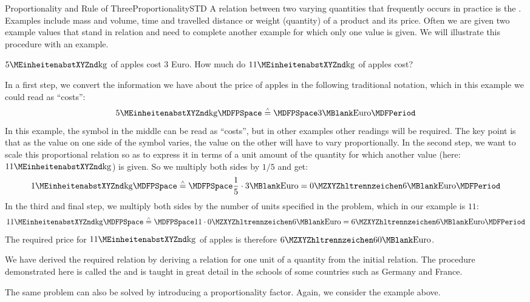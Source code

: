 \begin{MXContent}{Proportionality and Rule of Three}{Proportionality}{STD}
A relation between two varying quantities that frequently occurs in practice is the 
. Examples include 
mass and volume, time and travelled distance or weight (quantity) of a product and its price. 
Often we are given two example values that stand in relation and need to complete another example for which only one value is given.
We will illustrate this procedure with an example. 


\begin{MExample}
$5\MEinheit{kg}$ of apples cost $3$ Euro. How much do $11\MEinheit{kg}$
of apples cost?
\par
In a first step, we convert the information we have about the price of apples in the following traditional notation, which in this example we could read as ``costs'':
$$
5\MEinheit{kg} \MDFPSpace \MRelates \MDFPSpace 3\MBlank \text{Euro}
\MDFPeriod
$$
In this example, the symbol in the middle can be read as ``costs'', but in other examples other readings will be required. The key point is that as the value on one side of the
symbol varies, the value on the other will have to vary proportionally.
In the second step, we want to scale this proportional relation so as to express it in terms of a unit amount of the quantity for which another value (here: $11\MEinheit{kg}$) is given. So we multiply both sides by $1/5$ and get:
$$
1\MEinheit{kg} \MDFPSpace \MRelates \MDFPSpace 
\frac{1}{5}\cdot 3\MBlank \text{Euro} = \MZahl{0}{6}\MBlank \text{Euro}
\MDFPeriod
$$
In the third and final step, we multiply both sides by the number of units specified
in the problem, which in our example is $11$: 
$$
11\MEinheit{kg} \MDFPSpace \MRelates \MDFPSpace 
11\cdot\MZahl{0}{6}\MBlank \text{Euro} = \MZahl{6}{6}\MBlank \text{Euro}
\MDFPeriod
$$
The required price for $11\MEinheit{kg}$ of apples is therefore
$\MZahl{6}{60}\MBlank \text{Euro}$.
\end{MExample}

We have derived the required relation by deriving a relation for one unit of a quantity from 
the initial relation. The procedure demonstrated here is called the
 and is taught in great detail in the schools of some countries such as Germany and France.

The same problem can also be solved by introducing a proportionality factor. 
Again, we consider the example above.


\end{MXContent}
